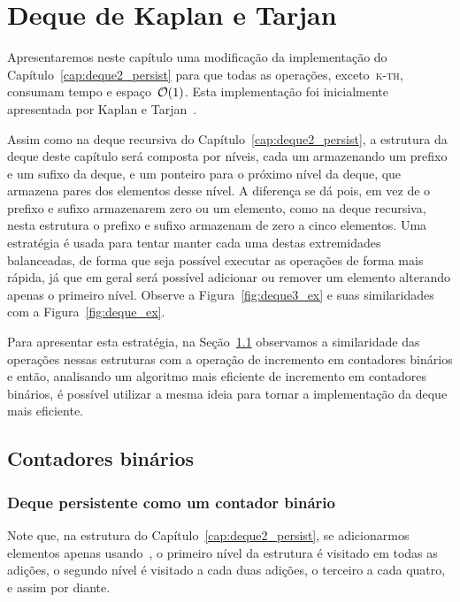 \documentclass[main.tex]{subfiles}
\begin{document}
\chapter{Deque de Kaplan e Tarjan} \label{cap:deque3_persist}

Apresentaremos neste capítulo uma modificação da implementação do Capítulo~\ref{cap:deque2_persist} para que todas as operações, exceto~\textsc{k-th}, consumam tempo e espaço~$\mathcal{O}(1)$. Esta implementação foi inicialmente apresentada por Kaplan e Tarjan~\cite{KaplanT1999}.

Assim como na deque recursiva do Capítulo~\ref{cap:deque2_persist}, a estrutura da deque deste capítulo será composta por níveis, cada um armazenando um prefixo e um sufixo da deque, e um ponteiro para o próximo nível da deque, que armazena pares dos elementos desse nível. A diferença se dá pois, em vez de o prefixo e sufixo armazenarem zero ou um elemento, como na deque recursiva, nesta estrutura o prefixo e sufixo armazenam de zero a cinco elementos. Uma estratégia é usada para tentar manter cada uma destas extremidades balanceadas, de forma que seja possível executar as operações de forma mais rápida, já que em geral será possível adicionar ou remover um elemento alterando apenas o primeiro nível. Observe a Figura~\ref{fig:deque3_ex} e suas similaridades com a Figura~\ref{fig:deque_ex}.

Para apresentar esta estratégia, na Seção~\ref{sec:contbin} observamos a similaridade das operações nessas estruturas com a operação de incremento em contadores binários e então, analisando um algoritmo mais eficiente de incremento em contadores binários, é possível utilizar a mesma ideia para tornar a implementação da deque mais eficiente.

\section{Contadores binários} \label{sec:contbin}

\subsection{Deque persistente como um contador binário} \label{subsec:contbin_simples}

Note que, na estrutura do Capítulo~\ref{cap:deque2_persist}, se adicionarmos elementos apenas usando~, o primeiro nível da estrutura é visitado em todas as adições, o segundo nível é visitado a cada duas adições, o terceiro a cada quatro, e assim por diante.
\end{document}
